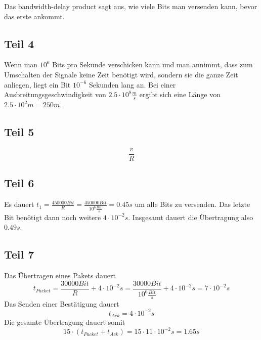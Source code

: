 \documentclass[10pt,a4paper]{article}
\begin{document}
Das bandwidth-delay product sagt aus, wie viele Bits man versenden kann, bevor
das erste ankommt.

\subsection{Teil 4}

Wenn man $10^{6}$ Bits pro Sekunde verschicken kann und man annimmt, dass zum
Umschalten der Signale keine Zeit benötigt wird, sondern sie die ganze Zeit
anliegen, liegt ein Bit $10^{-6}$ Sekunden lang an. Bei einer
Ausbreitungsgeschwindigkeit von $2.5 \cdot 10^{8} \frac{m}{s}$ ergibt sich eine
Länge von $2.5 \cdot 10^{2} m = 250m$.

\subsection{Teil 5}

\begin{equation}
  \frac{v}{R}
\end{equation}

\subsection{Teil 6}

Es dauert $t_{1} = \frac{450000 Bit}{R} = \frac{450000 Bit}{10^{6}
  \frac{Bit}{s}} = 0.45s$ um alle Bits zu versenden. Das letzte Bit benötigt
dann noch weitere $4 \cdot 10^{-2}s$. Insgesamt dauert die Übertragung also
$0.49s$.

\subsection{Teil 7}

Das Übertragen eines Pakets dauert
\begin{equation}
  t_{Packet} = \frac{30000 Bit}{R} + 4 \cdot 10^{-2}s = \frac{30000 Bit}{10^{6} \frac{Bit}{s}} + 4 \cdot 10^{-2}s = 7 \cdot 10^{-2}s
\end{equation}
Das Senden einer Bestätigung dauert
\begin{equation}
  t_{Ack} = 4 \cdot 10^{-2}s
\end{equation}
Die gesamte Übertragung dauert somit
\begin{equation}
  15 \cdot (t_{Packet} + t_{Ack}) = 15 \cdot 11 \cdot 10^{-2}s = 1.65s
\end{equation}
\end{document}
